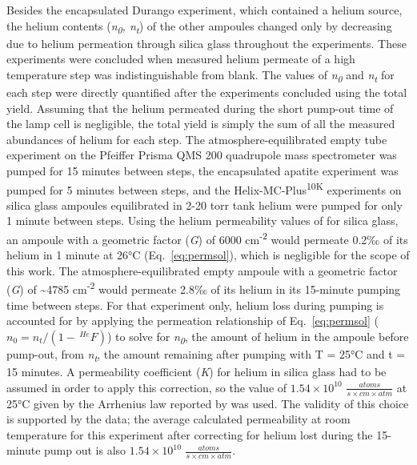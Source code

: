 Besides the encapsulated Durango experiment, which contained a helium source, the helium contents (\emph{n\textsubscript{0}, n\textsubscript{t}}) of the other ampoules changed only by decreasing due to helium permeation through silica glass throughout the experiments. These experiments were concluded when measured helium permeate of a high temperature step was indistinguishable from blank. The values of \emph{n\textsubscript{0}} and \emph{n\textsubscript{t}} for each step were directly quantified after the experiments concluded using the total yield. Assuming that the helium permeated during the short pump-out time of the lamp cell is negligible, the total yield is simply the sum of all the measured abundances of helium for each step. The atmosphere-equilibrated empty tube experiment on the Pfeiffer Prisma QMS 200 quadrupole mass spectrometer was pumped for 15 minutes between steps, the encapsulated apatite experiment was pumped for 5 minutes between steps, and the Helix-MC-Plus\textsuperscript{10K} experiments on silica glass ampoules equilibrated in 2-20 torr tank helium were pumped for only 1 minute between steps. Using the helium permeability values of \citet{swets1961} for silica glass, an ampoule with a geometric factor (\emph{G}) of 6000 cm\textsuperscript{-2} would permeate 0.2‰ of its helium in 1 minute at 26°C (Eq.~\eqref{eq:permsol}), which is negligible for the scope of this work. The atmosphere-equilibrated empty ampoule with a geometric factor (\emph{G}) of \textasciitilde4785 cm\textsuperscript{-2} would permeate 2.8‰ of its helium in its 15-minute pumping time between steps. For that experiment only, helium loss during pumping is accounted for by applying the permeation relationship of Eq.~\eqref{eq:permsol} (\(n_{0} = n_{t}/(1 - \,^{He}F)\)) to solve for \emph{n\textsubscript{0}}, the amount of helium in the ampoule before pump-out, from \emph{n\textsubscript{t}}, the amount remaining after pumping with T = 25°C and t = 15 minutes. A permeability coefficient (\emph{K}) for helium in silica glass had to be assumed in order to apply this correction, so the value of \(1.54 \times 10^{10}\) \(\frac{atoms}{s \times cm \times atm}\) at 25°C given by the Arrhenius law reported by \citet{swets1961} was used. The validity of this choice is supported by the data; the average calculated permeability at room temperature for this experiment after correcting for helium lost during the 15-minute pump out is also \(1.54 \times 10^{10}\) \(\frac{atoms}{s \times cm \times atm}\).


